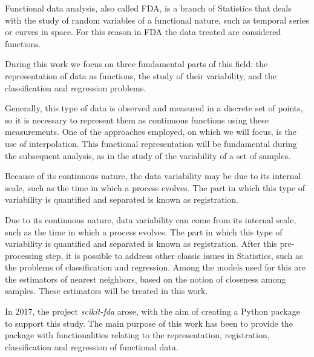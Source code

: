 Functional data analysis, also called FDA, is a branch of Statistics that deals
with the study of random variables of a functional nature, such as temporal
series or curves in space. For this reason in FDA the data treated are
considered functions.

During this work we focus on three fundamental parts of this field:
the representation of data as functions, the study of their variability,
and the classification and regression problems.

Generally, this type of data is observed and measured in a discrete set of
points, so it is necessary to represent them as continuous functions using
these measurements. One of the approaches employed, on which we will focus, is the
use of interpolation. This functional representation will be fundamental during
the subsequent analysis, as in the study of the variability of a set of samples.

Because of its continuous nature, the data variability may be due to its
internal scale, such as the time in which a process evolves.
The part in which this type of variability is quantified and separated is known
as registration.

Due to its continuous nature, data variability can come from its internal scale,
such as the time in which a process evolves. The part in which this
type of variability is quantified and separated is known as registration.
After this pre-processing step, it is possible to address other classic
issues in Statistics, such as the problems of classification and regression.
Among the models used for this are the estimators of nearest neighbors,
based on the notion of closeness among samples. These estimators
will be treated in this work.

In 2017, the project \textit{scikit-fda} arose, with the aim of creating a
Python package to support this study. The main purpose of this work has been to
provide the package with functionalities relating to the representation,
registration, classification and regression of functional data.
